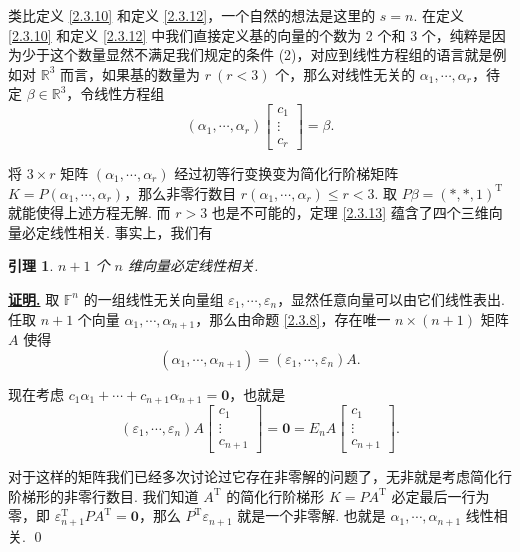 \documentclass[10pt,openany]{article}
\theoremstyle{thmstyle} %
\theoremstyle{defstyle} %
\newtheorem{lemma}[theorem]{引理}
\theoremstyle{prostyle} %
\theoremstyle{exastyle}
\theoremstyle{remstyle}
\renewenvironment{proof}[1][证明]{\par\underline{\textbf{#1.}} \;\fangsong}{\qed\par}
\newcommand{\T}{^{\text{T}}}
\newcommand{\F}{\mathbb{F}}
\newcommand{\R}{\mathbb{R}}
\begin{document}
类比定义 \ref{2.3.10} 和定义 \ref{2.3.12}，一个自然的想法是这里的 \( s=n \). 在定义 \ref{2.3.10} 和定义 \ref{2.3.12} 中我们直接定义基的向量的个数为 2 个和 3 个，纯粹是因为少于这个数量显然不满足我们规定的条件 (2)，对应到线性方程组的语言就是例如对 \( \R^3 \) 而言，如果基的数量为 \( r \ (r<3) \) 个，那么对线性无关的 \( \alpha_1,\cdots,\alpha_r \)，待定 \( \beta \in \R^3 \)，令线性方程组
\[ (\alpha_1,\cdots,\alpha_r)\begin{bmatrix}
	c_1 \\ \vdots \\ c_r
\end{bmatrix}= \beta. \]

将 \( 3 \times r \) 矩阵 \( (\alpha_1,\cdots,\alpha_r) \) 经过初等行变换变为简化行阶梯矩阵 \( K=P(\alpha_1,\cdots,\alpha_r) \)，那么非零行数目 \( r(\alpha_1,\cdots,\alpha_r) \leq r<3 \). 取 \( P\beta=(*,*,1)\T \) 就能使得上述方程无解. 而 \( r>3 \) 也是不可能的，定理 \ref{2.3.13} 蕴含了四个三维向量必定线性相关. 事实上，我们有

\begin{lemma}\label{2.3.15}
	\( n+1 \) 个 \( n \) 维向量必定线性相关. 
\end{lemma}

\begin{proof}
	取 \( \F^n \) 的一组线性无关向量组 \( \varepsilon_1,\cdots,\varepsilon_n \)，显然任意向量可以由它们线性表出. 任取 \( n+1 \) 个向量 \( \alpha_1,\cdots,\alpha_{n+1} \)，那么由命题 \ref{2.3.8}，存在唯一 \( n \times (n+1) \) 矩阵 \( A \) 使得
	\[ (\alpha_1,\cdots,\alpha_{n+1})=(\varepsilon_1,\cdots,\varepsilon_n)A. \]
	
	现在考虑 \( c_1\alpha_1+\cdots+c_{n+1}\alpha_{n+1}=\bm{0} \)，也就是
	\[ (\varepsilon_1,\cdots,\varepsilon_n)A\begin{bmatrix}
		c_1 \\ \vdots \\ c_{n+1}
	\end{bmatrix}=\bm{0}=E_nA\begin{bmatrix}
	c_1 \\ \vdots \\ c_{n+1}
	\end{bmatrix}. \] 
	
	对于这样的矩阵我们已经多次讨论过它存在非零解的问题了，无非就是考虑简化行阶梯形的非零行数目. 我们知道 \( A\T \) 的简化行阶梯形 \( K=PA\T \) 必定最后一行为零，即 \( \varepsilon_{n+1}\T PA\T=\bm{0} \)，那么 \( P\T \varepsilon_{n+1} \) 就是一个非零解. 也就是 \( \alpha_1,\cdots,\alpha_{n+1} \) 线性相关.
\end{proof}
\end{document}
